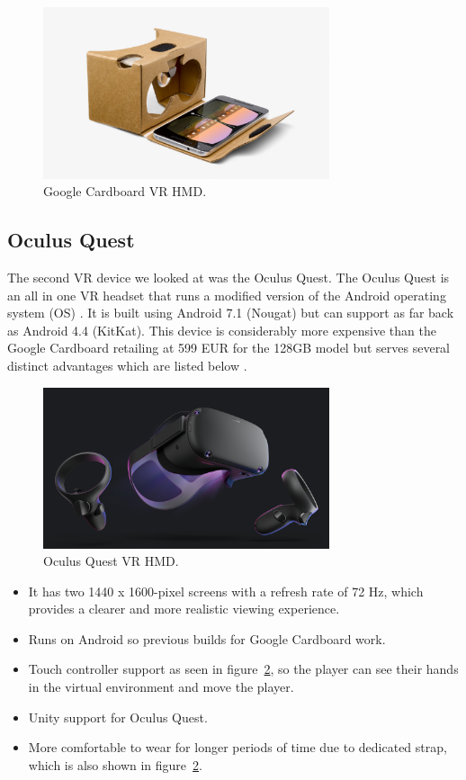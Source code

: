 \begin{figure}[h!]
	\caption{Google Cardboard VR HMD.}
	\label{image:googlevr}
	\centering
	\includegraphics[width=0.75\textwidth]{Images/google_cardboard.jpg}
\end{figure}	

\subsection{Oculus Quest}
The second VR device we looked at was the Oculus Quest. The Oculus Quest is an all in one VR headset that runs a modified version of the Android operating system (OS) \cite{13685558020190801}. It is built using Android 7.1 (Nougat) but can support as far back as Android 4.4 (KitKat). This device is considerably more expensive than the Google Cardboard retailing at 599 EUR for the 128GB model but serves several distinct advantages which are listed below \cite{13685558020190801}.

\begin{figure}[h!]
	\caption{Oculus Quest VR HMD.}
	\label{image:oculusquest}
	\centering
	\includegraphics[width=0.75\textwidth]{Images/oculus_quest.png}
\end{figure}

\begin{itemize}
    \item It has two 1440 x 1600-pixel screens with a refresh rate of 72 Hz, which provides a clearer and more realistic viewing experience.
    \item Runs on Android so previous builds for Google Cardboard work.
    \item Touch controller support as seen in figure~\ref{image:oculusquest}, so the player can see their hands in the virtual environment and move the player.
    \item Unity support for Oculus Quest.
    \item More comfortable to wear for longer periods of time due to dedicated strap, which is also shown in figure~\ref{image:oculusquest}.
\end{itemize}

